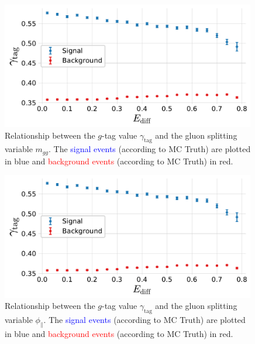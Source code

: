 \begin{figure}
  \centerfloat
  \includegraphics[width=0.99\textwidth, trim=0 0 0 0, clip, page=5]{figures/quarks/gtag-g_splitting_gtag_errorbar-down_sample=1.00-ML_vars=vertex-selection=b-ejet_min=4-n_iter_RS_lgb=99-n_iter_RS_xgb=9-cdot_cut=0.90-version=19-njet=4.pdf}
  \caption[Relationship Between the $g$-Tag Value $\gamma_\mathrm{tag}$ and the Gluon Splitting Variable $m_{gg}$]
          {Relationship between the $g$-tag value $\gamma_\mathrm{tag}$ and the gluon splitting variable $m_{gg}$. The \textcolor{blue}{signal events} (according to MC Truth) are plotted in blue and \textcolor{red}{background events} (according to MC Truth) in red. 
          } 
  \label{fig:q:gtag_gluon_splitting_variable_m_gg}
\end{figure}
\begin{figure}
  \centerfloat
  \includegraphics[width=0.99\textwidth, trim=0 0 0 0, clip, page=6]{figures/quarks/gtag-g_splitting_gtag_errorbar-down_sample=1.00-ML_vars=vertex-selection=b-ejet_min=4-n_iter_RS_lgb=99-n_iter_RS_xgb=9-cdot_cut=0.90-version=19-njet=4.pdf}
  \caption[Relationship Between the $g$-Tag Value $\gamma_\mathrm{tag}$ and the Gluon Splitting Variable $\phi_\mathrm{\parallel}$]
          {Relationship between the $g$-tag value $\gamma_\mathrm{tag}$ and the gluon splitting variable $\phi_\mathrm{\parallel}$. The \textcolor{blue}{signal events} (according to MC Truth) are plotted in blue and \textcolor{red}{background events} (according to MC Truth) in red. 
          } 
  \label{fig:q:gtag_gluon_splitting_variable_phi_planes}
\end{figure}
